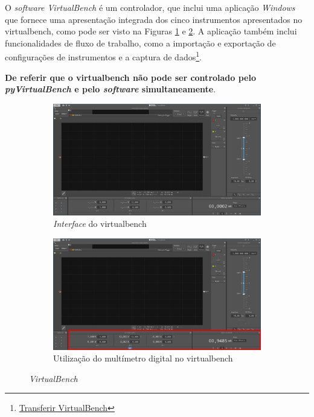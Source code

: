 O \textit{software VirtualBench} é um controlador, que inclui uma aplicação \textit{Windows} que fornece uma apresentação integrada dos cinco instrumentos apresentados no \acrshort{virtualbench}, como pode ser visto na Figuras \ref{fig:interfaceVB} e \ref{fig:leituraohm}. A aplicação também inclui funcionalidades de fluxo de trabalho, como a importação e exportação de configurações de instrumentos e a captura de dados\footnote{\href{https://www.ni.com/en/support/downloads/drivers/download.virtualbench-software.html}{Transferir VirtualBench}}.

\vspace{0.5cm}
\textbf{De referir que o \acrshort{virtualbench} não pode ser controlado pelo \textit{pyVirtualBench} e pelo \textit{software} simultaneamente}.
\vspace{0.5cm}

\begin{figure}
    \centering
    \begin{subfigure}[b]{1\textwidth}
        \centering
        \includegraphics[width=\textwidth]{figures/VB8012-Desktop.png}
        \caption{\textit{Interface} do \acrshort{virtualbench}}
        \label{fig:interfaceVB}
    \end{subfigure}
    \hfill
    \begin{subfigure}[b]{1\textwidth}
        \centering
        \includegraphics[width=\textwidth]{figures/VB8012-OHM_Exemplo.png}
        \caption{Utilização do multímetro digital no \acrshort{virtualbench}}
        \label{fig:leituraohm}
    \end{subfigure}
    \hfill
    \caption{\textit{VirtualBench}}
    \label{fig:VB_OHM_Exemplo}
\end{figure}

